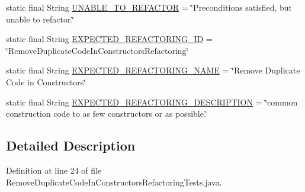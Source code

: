 \begin{DoxyCompactItemize}
\item 
static final String \hyperlink{classedu_1_1illinois_1_1canistelCassabanana_1_1tests_1_1RemoveDuplicateCodeInConstructorsRefactoringTests_a41a2b2c573bfe5d793565302ca9637ab}{UNABLE\_\-TO\_\-REFACTOR} = \char`\"{}Preconditions satisfied, but unable to refactor.\char`\"{}
\item 
static final String \hyperlink{classedu_1_1illinois_1_1canistelCassabanana_1_1tests_1_1RemoveDuplicateCodeInConstructorsRefactoringTests_afaed708bee891f511d416153a09b2822}{EXPECTED\_\-REFACTORING\_\-ID} = \char`\"{}RemoveDuplicateCodeInConstructorsRefactoring\char`\"{}
\item 
static final String \hyperlink{classedu_1_1illinois_1_1canistelCassabanana_1_1tests_1_1RemoveDuplicateCodeInConstructorsRefactoringTests_a6731732fcf429dca7528f1b1e9327d96}{EXPECTED\_\-REFACTORING\_\-NAME} = \char`\"{}Remove Duplicate Code in Constructors\char`\"{}
\item 
static final String \hyperlink{classedu_1_1illinois_1_1canistelCassabanana_1_1tests_1_1RemoveDuplicateCodeInConstructorsRefactoringTests_a093baeba2e5e938d962b85eb72b91f41}{EXPECTED\_\-REFACTORING\_\-DESCRIPTION} = \char`\"{}common construction code to as few constructors or as possible.\char`\"{}
\end{DoxyCompactItemize}


\subsection{Detailed Description}


Definition at line 24 of file RemoveDuplicateCodeInConstructorsRefactoringTests.java.



